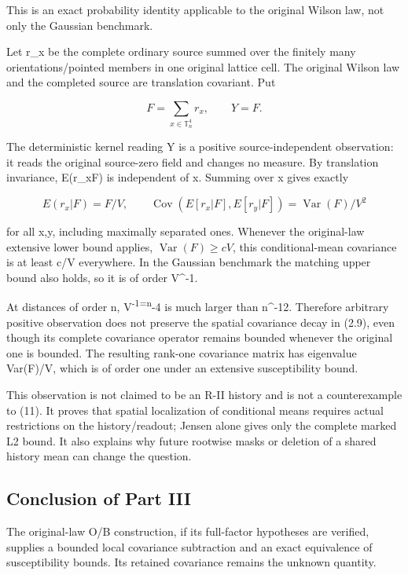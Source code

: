 \documentclass[
  11pt,
]{article}
\begin{document}
This is an exact probability identity applicable to the original Wilson
law, not only the Gaussian benchmark.

Let r\_x be the complete ordinary source summed over the finitely many
orientations/pointed members in one original lattice cell. The original
Wilson law and the completed source are translation covariant. Put

\[
 F=\sum_{x\in\mathbb T_n^4}r_x,
 \qquad Y=F.
\]

The deterministic kernel reading Y is a positive source-independent
observation: it reads the original source-zero field and changes no
measure. By translation invariance, E(r\_x\textbar F) is independent of
x. Summing over x gives exactly

\[
 E(r_x|F)=F/V,
 \qquad
 \operatorname{Cov}(E[r_x|F],E[r_y|F])
 =\operatorname{Var}(F)/V^2
\tag{4.1}
\]

for all x,y, including maximally separated ones. Whenever the
original-law extensive lower bound applies,
\(\operatorname{Var}(F)\ge cV\), this conditional-mean covariance is at
least c/V everywhere. In the Gaussian benchmark the matching upper bound
also holds, so it is of order V\^{}-1.

At distances of order n, V\textsuperscript{-1=n}-4 is much larger than
n\^{}-12. Therefore arbitrary positive observation does not preserve the
spatial covariance decay in (2.9), even though its complete covariance
operator remains bounded whenever the original one is bounded. The
resulting rank-one covariance matrix has eigenvalue Var(F)/V, which is
of order one under an extensive susceptibility bound.

This observation is not claimed to be an R-II history and is not a
counterexample to (11). It proves that spatial localization of
conditional means requires actual restrictions on the history/readout;
Jensen alone gives only the complete marked L2 bound. It also explains
why future rootwise masks or deletion of a shared history mean can
change the question.

\hypertarget{conclusion-of-part-iii}{%
\subsection{Conclusion of
Part III}\label{conclusion-of-part-iii}}

The original-law O/B construction, if its full-factor hypotheses are
verified, supplies a bounded local covariance subtraction and an exact
equivalence of susceptibility bounds. Its retained covariance remains
the unknown quantity.
\end{document}
